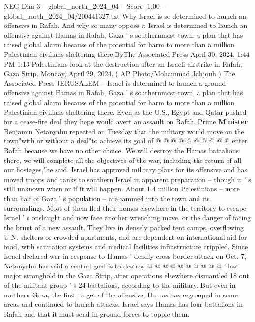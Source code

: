 \begin{textsample}{NEG Dim 3 – global\_north\_2024\_04 – Score -1.00 – global\_north\_2024\_04/200441327.txt}  \label{ex:f3_neg_378}
Why Israel is so determined to launch an offensive in Rafah.
And why so many oppose it Israel is determined to launch an offensive against Hamas in Rafah, Gaza ' s southernmost town, a plan that has raised global alarm because of the potential for harm to more than a million Palestinian civilians sheltering there ByThe Associated Press April 30, 2024, 1:44 PM 1:13 Palestinians look at the destruction after an Israeli airstrike in Rafah, Gaza Strip.
Monday, April 29, 2024. ( AP Photo/Mohammad Jahjouh ) The Associated Press JERUSALEM -- Israel is determined to launch a ground offensive against Hamas in Rafah, Gaza ' s southernmost town, a plan that has raised global alarm because of the potential for harm to more than a million Palestinian civilians sheltering there.
Even as the U.S., Egypt and Qatar pushed for a cease-fire deal they hope would avert an assault on Rafah, Prime \textbf{Minister} Benjamin Netanyahu repeated on Tuesday that the military would move on the town"with or without a deal"to achieve its goal of @ @ @ @ @ @ @ @ @ @ enter Rafah because we have no other choice.
We will destroy the Hamas battalions there, we will complete all the objectives of the war, including the return of all our hostages,"he said.
Israel has approved military plans for its offensive and has moved troops and tanks to southern Israel in apparent preparation -- though it ' s still unknown when or if it will happen.
About 1.4 million Palestinians -- more than half of Gaza ' s population -- are jammed into the town and its surroundings.
Most of them fled their homes elsewhere in the territory to escape Israel ' s onslaught and now face another wrenching move, or the danger of facing the brunt of a new assault.
They live in densely packed tent camps, overflowing U.N. shelters or crowded apartments, and are dependent on international aid for food, with sanitation systems and medical facilities infrastructure crippled.
Since Israel declared war in response to Hamas ' deadly cross-border attack on Oct. 7, Netanyahu has said a central goal is to destroy @ @ @ @ @ @ @ @ @ @ ' last major stronghold in the Gaza Strip, after operations elsewhere dismantled 18 out of the militant group ' s 24 battalions, according to the military.
But even in northern Gaza, the first target of the offensive, Hamas has regrouped in some areas and continued to launch attacks.
Israel says Hamas has four battalions in Rafah and that it must send in ground forces to topple them.

\end{textsample}
